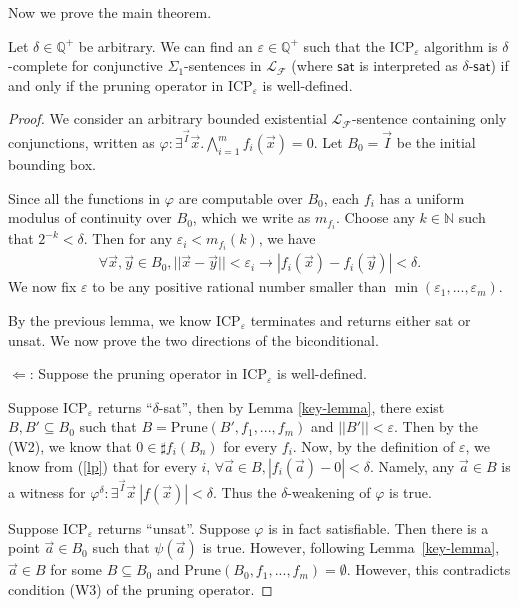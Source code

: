 \documentclass[envcountsect]{llncs}
\begin{document}
Now we prove the main theorem. 
\begin{theorem}\label{main-theorem}
Let $\delta\in \mathbb{Q}^+$ be arbitrary. We can find an $\varepsilon\in \mathbb{Q}^+$ such that the $\mathrm{ICP}_{\varepsilon}$ algorithm is $\delta$-complete for conjunctive $\Sigma_1$-sentences in $\mathcal{L}_{\mathcal{F}}$ (where $\mathsf{sat}$ is interpreted as $\delta$-$\mathsf{sat}$) if and only if the pruning operator in ICP$_{\varepsilon}$ is well-defined. 
\end{theorem}
\begin{proof}
We consider an arbitrary bounded existential $\mathcal{L}_{\mathcal{F}}$-sentence containing only conjunctions, written as $\varphi: \exists^{\vec I}\vec x. \bigwedge_{i=1}^m f_i(\vec x) = 0$. Let $B_0 = \vec I$ be the initial bounding box. 

Since all the functions in $\varphi$ are computable over $B_0$, each $f_i$ has a uniform modulus of continuity over $B_0$, which we write as $m_{f_i}$. Choose any $k\in \mathbb{N}$ such that $2^{-k}<\delta$. Then for any $\varepsilon_i<m_{f_i}(k)$, we have 
\begin{eqnarray}\label{lp}
\forall \vec x, \vec y\in B_0, ||\vec x-\vec y||<\varepsilon_i\rightarrow |f_i(\vec x)-f_i(\vec y)|<\delta.
\end{eqnarray}
We now fix $\varepsilon$ to be any positive rational number smaller than $\min(\varepsilon_1,...,\varepsilon_m)$.
 
By the previous lemma, we know ICP$_{\varepsilon}$ terminates and returns either {\sf sat} or {\sf unsat}. We now prove the two directions of the biconditional.

$\Leftarrow$: Suppose the pruning operator in ICP$_{\varepsilon}$ is well-defined.

Suppose ICP$_{\varepsilon}$ returns ``$\delta$-sat'', then by Lemma \ref{key-lemma}, there exist $B, B'\subseteq B_0$ such that $B = \mathrm{Prune}(B',f_1,...,f_m)$ and $||B'||<\varepsilon$. Then by the (W2), we know that $0\in \sharp f_i(B_{n})$ for every $f_i$. Now, by the definition of $\varepsilon$, we know from (\ref{lp}) that for every $i$, $\forall \vec a\in B, |f_i(\vec a)-0|<\delta.$ Namely, any $\vec a\in B$ is a witness for $\varphi^{\delta}: \exists^{\vec I} \vec x\ |f(\vec x)|<\delta$. Thus the $\delta$-weakening of $\varphi$ is true. 

Suppose ICP$_{\varepsilon}$ returns ``unsat''. Suppose $\varphi$ is in fact satisfiable. Then there is a point $\vec a\in B_0$ such that $\psi(\vec a)$ is true. However, following Lemma~\ref{key-lemma}, $\vec a\in B$ for some $B\subseteq B_0$ and $\mathrm{Prune}(B_0,f_1,...,f_m) = \emptyset$. However, this contradicts condition (W3) of the pruning operator. 


\end{proof}
\end{document}
